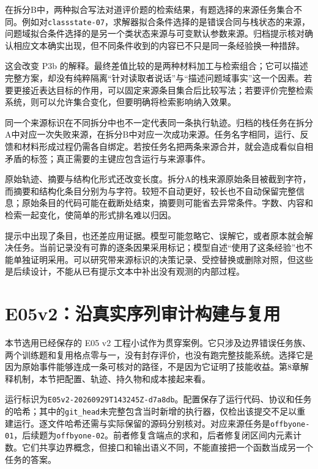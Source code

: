 在拆分B中，两种拟合写法对道评价题的检索结果，有题选择的来源任务集合不同。例如对\texttt{classstate-07}，求解器拟合条件选择的是错误合同与栈状态的来源，问题域拟合条件选择的是另一个类状态来源与可变默认参数来源。归档提示核对确认相应文本确实出现，但不同条件收到的内容已不只是同一条经验换一种措辞。

这会改变 P3b 的解释。最终差值比较的是两种材料加工与检索组合；它可以描述完整方案，却没有纯粹隔离“针对读取者说话”与“描述问题域事实”这一个因素。若要更接近表达目标的作用，可以固定来源条目集合后比较写法；若要评价完整检索系统，则可以允许集合变化，但要明确将检索影响纳入效果。

同一个来源标识在不同拆分中也不一定代表同一条执行轨迹。归档的栈任务在拆分A中对应一次失败来源，在拆分B中对应一次成功来源。任务名字相同，运行、反馈和材料形成过程仍需各自绑定。若按任务名把两条来源合并，就会造成看似自相矛盾的标签；真正需要的主键应包含运行与来源事件。

原始轨迹、摘要与结构化形式还改变长度。拆分A的栈来源原始条目被截到字符，而摘要和结构化条目分别为与字符。较短不自动更好，较长也不自动保留完整信息；原始条目的代码可能在截断处结束，摘要则可能省去异常条件。字数、内容和检索一起变化，使简单的形式排名难以归因。

提示中出现了条目，也还差应用证据。模型可能忽略它、误解它，或者原本就会解决任务。当前记录没有可靠的逐条因果采用标记；模型自述“使用了这条经验”也不能单独证明采用。可以研究带来源标识的决策记录、受控替换或删除对照，但这些是后续设计，不能从已有提示文本中补出没有观测的内部过程。

\section{E05v2：沿真实序列审计构建与复用}
\label{sec:ch15-e05case}

本节选用已经保存的 E05 v2 工程小试作为贯穿案例。它只涉及边界错误任务族、两个训练题和复用格点零与一，没有封存评价，也没有跑完整技能系统。选择它是因为原始事件能够连成一条可核对的路径，不是因为它证明了技能收益。第8章解释机制，本节把配置、轨迹、持久物和成本接起来看。

运行标识为\texttt{E05v2-20260929T143245Z-d7a8db}。配置保存了运行代码、协议和任务的哈希；其中的\texttt{git\_head}未完整包含当时新增的执行器，仅检出该提交不足以重建运行。逐文件哈希还需与实际保留的源码分别核对。对应来源任务是\texttt{offbyone-01}，后续题为\texttt{offbyone-02}。前者修复含端点的求和，后者修复闭区间内元素计数。它们共享边界概念，但接口和输出语义不同，不能直接把一个函数当成另一个任务的答案。

